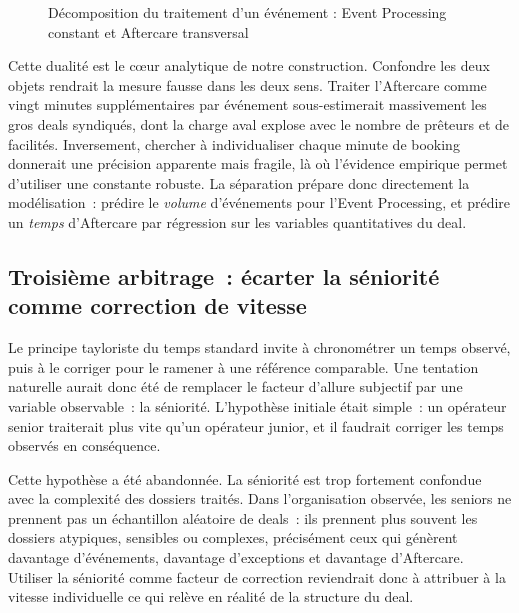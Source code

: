 \begin{figure}[htbp]
\caption{Décomposition du traitement d'un événement : Event Processing constant et Aftercare transversal}
\label{fig:flux-ep-aftercare-style}
\end{figure}



Cette dualité est le cœur analytique de notre construction. Confondre les deux objets rendrait la mesure fausse dans les deux sens. Traiter l'Aftercare comme vingt minutes supplémentaires par événement sous-estimerait massivement les gros deals syndiqués, dont la charge aval explose avec le nombre de prêteurs et de facilités. Inversement, chercher à individualiser chaque minute de booking donnerait une précision apparente mais fragile, là où l'évidence empirique permet d'utiliser une constante robuste. La séparation prépare donc directement la modélisation~: prédire le \emph{volume} d'événements pour l'Event Processing, et prédire un \emph{temps} d'Aftercare par régression sur les variables quantitatives du deal.

\subsection{Troisième arbitrage~: écarter la séniorité comme correction de vitesse}
\label{sec:arbitrage-seniorite}

Le principe tayloriste du temps standard invite à chronométrer un temps observé, puis à le corriger pour le ramener à une référence comparable. Une tentation naturelle aurait donc été de remplacer le facteur d'allure subjectif par une variable observable~: la séniorité. L'hypothèse initiale était simple~: un opérateur senior traiterait plus vite qu'un opérateur junior, et il faudrait corriger les temps observés en conséquence.

Cette hypothèse a été abandonnée. La séniorité est trop fortement confondue avec la complexité des dossiers traités. Dans l'organisation observée, les seniors ne prennent pas un échantillon aléatoire de deals~: ils prennent plus souvent les dossiers atypiques, sensibles ou complexes, précisément ceux qui génèrent davantage d'événements, davantage d'exceptions et davantage d'Aftercare. Utiliser la séniorité comme facteur de correction reviendrait donc à attribuer à la vitesse individuelle ce qui relève en réalité de la structure du deal.


